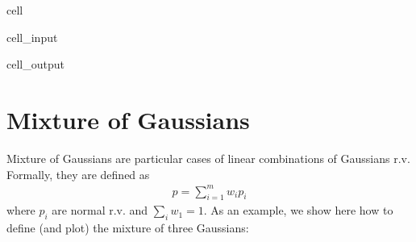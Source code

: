 \documentclass[letterpaper,10pt,english]{jupyterBook}
\begin{document}
\begin{sphinxuseclass}{cell}
\begin{sphinxVerbatimInput}
\begin{sphinxuseclass}{cell_input}
\begin{sphinxVerbatim}[commandchars=\\\{\}]
       \PYG{p}{[}\PYG{p}{]}
\end{sphinxVerbatim}

\end{sphinxuseclass}\end{sphinxVerbatimInput}
\begin{sphinxVerbatimOutput}

\begin{sphinxuseclass}{cell_output}
\noindent{}

\end{sphinxuseclass}\end{sphinxVerbatimOutput}

\end{sphinxuseclass}

\section{Mixture of Gaussians}
\label{\detokenize{01:mixture-of-gaussians}}
\sphinxAtStartPar
Mixture of Gaussians are particular cases of linear combinations of Gaussians r.v. Formally, they are defined as
\begin{equation*}
\begin{split}p = \sum_{i=1}^m w_i p_i\end{split}
\end{equation*}
\sphinxAtStartPar
where \(p_i\) are normal r.v. and \(\sum_i w_1=1\).
As an example, we show here how to define (and plot) the mixture of three Gaussians:
\end{document}
